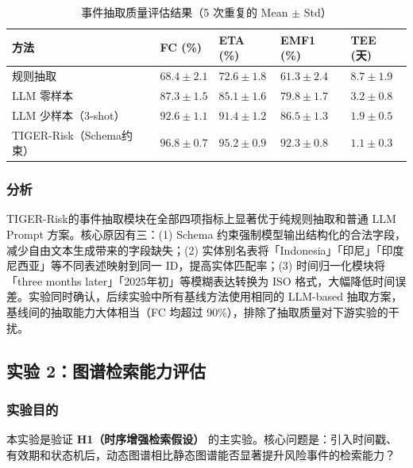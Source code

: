 \documentclass[12pt,a4paper]{article}
\newcommand{\projectshort}{TIGER-Risk}
\newcommand{\term}[1]{\textbf{#1}}
\begin{document}
\begin{table}[H]
\centering
\footnotesize
\caption{事件抽取质量评估结果（5 次重复的 Mean $\pm$ Std）}
\label{tab:exp-extraction}
\begin{tabularx}{0.95\linewidth}{>{\raggedright\arraybackslash}p{2.8cm} >{\centering\arraybackslash}X >{\centering\arraybackslash}X >{\centering\arraybackslash}X >{\centering\arraybackslash}X}
\toprule
\textbf{方法} & \textbf{FC (\%)} & \textbf{ETA (\%)} & \textbf{EMF1 (\%)} & \textbf{TEE (天)} \\
\midrule
规则抽取 & $68.4 \pm 2.1$ & $72.6 \pm 1.8$ & $61.3 \pm 2.4$ & $8.7 \pm 1.9$ \\
LLM 零样本 & $87.3 \pm 1.5$ & $85.1 \pm 1.6$ & $79.8 \pm 1.7$ & $3.2 \pm 0.8$ \\
LLM 少样本（3-shot） & $92.6 \pm 1.1$ & $91.4 \pm 1.2$ & $86.5 \pm 1.3$ & $1.9 \pm 0.5$ \\
\projectshort（Schema约束） & $\mathbf{96.8 \pm 0.7}$ & $\mathbf{95.2 \pm 0.9}$ & $\mathbf{92.3 \pm 0.8}$ & $\mathbf{1.1 \pm 0.3}$ \\
\bottomrule
\end{tabularx}
\end{table}

\subsubsection{分析}

\projectshort 的事件抽取模块在全部四项指标上显著优于纯规则抽取和普通 LLM Prompt 方案。核心原因有三：(1) Schema 约束强制模型输出结构化的合法字段，减少自由文本生成带来的字段缺失；(2) 实体别名表将「Indonesia」「印尼」「印度尼西亚」等不同表述映射到同一 ID，提高实体匹配率；(3) 时间归一化模块将「three months later」「2025年初」等模糊表达转换为 ISO 格式，大幅降低时间误差。实验同时确认，后续实验中所有基线方法使用相同的 LLM-based 抽取方案，基线间的抽取能力大体相当（FC 均超过 90\%），排除了抽取质量对下游实验的干扰。

\subsection{实验 2：图谱检索能力评估}
\label{sec:exp-retrieval}

\subsubsection{实验目的}

本实验是验证 \term{H1（时序增强检索假设）} 的主实验。核心问题是：引入时间戳、有效期和状态机后，动态图谱相比静态图谱能否显著提升风险事件的检索能力？
\end{document}
